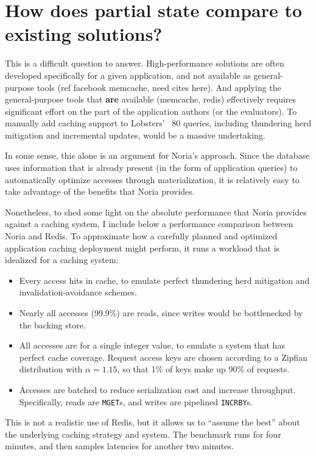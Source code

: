 \section{How does partial state compare to existing solutions?}
\label{s:eval:existing}

This is a difficult question to answer. High-performance solutions are
often developed specifically for a given application, and not available
as general-purpose tools (ref facebook memcache, need cites here).
And applying the general-purpose tools that \textbf{are} available (memcache,
redis) effectively requires significant effort on the part of the application
authors (or the evaluators). To manually add caching support to Lobsters' ~80
queries, including thundering herd mitigation and incremental updates, would be
a massive undertaking.

In some sense, this alone is an argument for Noria's approach. Since the
database uses information that is already present (in the form of application
queries) to automatically optimize accesses through materialization, it is
relatively easy to take advantage of the benefits that Noria provides.

Nonetheless, to shed some light on the absolute performance that Noria provides
against a caching system, I include below a performance comparison between Noria
and Redis. To approximate how a carefully planned and optimized application
caching deployment might perform, it runs a workload that is idealized for a
caching system:

\begin{itemize}
 \item Every access hits in cache, to emulate perfect thundering herd mitigation
   and invalidation-avoidance schemes.
 \item Nearly all accesses (99.9\%) are reads, since writes would be
   bottlenecked by the backing store.
 \item All accesses are for a single integer value, to emulate a system that has
   perfect cache coverage. Request access keys are chosen according to a Zipfian
    distribution with $\alpha = 1.15$, so that 1\% of keys make up 90\% of
    requests.
 \item Accesses are batched to reduce serialization cost and increase
   throughput. Specifically, reads are \texttt{MGET}s, and writes are pipelined
    \texttt{INCRBY}s.
\end{itemize}

This is not a realistic use of Redis, but it allows us to ``assume the best''
about the underlying caching strategy and system. The benchmark runs for four
minutes, and then samples latencies for another two minutes.

